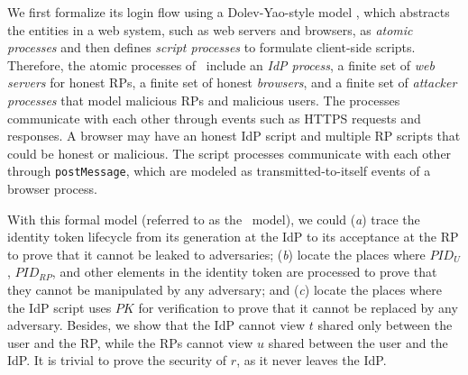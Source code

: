 

We first formalize its login flow using a Dolev-Yao-style model \cite{SPRESSO}, %
which abstracts the entities in a web system, such as web servers and browsers, as \emph{atomic processes} %
and then defines \emph{script processes} to formulate client-side scripts.
Therefore, the atomic processes of \usso~include an {\em IdP process}, a finite set of {\em web servers} for honest RPs, a finite set of honest {\em browsers}, and a finite set of {\em attacker processes} that model malicious RPs and malicious users. The processes communicate with each other through events such as HTTPS requests and responses. A browser may have an honest IdP script and multiple RP scripts that could be honest or malicious.
The script processes communicate with each other through \verb+postMessage+, which are modeled as transmitted-to-itself events of a browser process.

\newc
With this formal model (referred to as the \dy~model), we could (\emph{a}) trace the identity token lifecycle from its generation at the IdP to its acceptance at the RP to prove that it cannot be leaked to adversaries; (\emph{b}) locate the places where $PID_U$, $PID_{RP}$, and other elements in the identity token are processed to prove that they cannot be manipulated by any adversary; and (\emph{c}) locate the places where the IdP script uses $PK$ for verification to prove that it cannot be replaced by any adversary. Besides, we show that the IdP cannot view $t$ shared only between the user and the RP, while the RPs cannot view $u$ shared between the user and the IdP. It is trivial to prove the security of $r$, as it never leaves the IdP.

